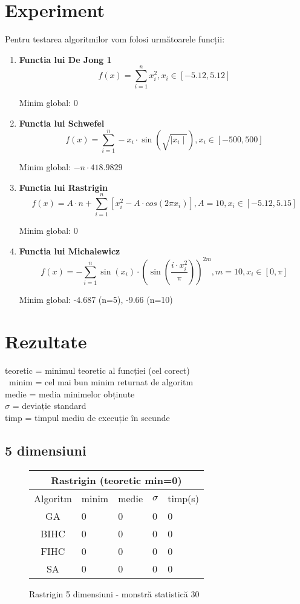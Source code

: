 \documentclass{article}
\begin{document}
\section{Experiment}
Pentru testarea algoritmilor vom folosi următoarele funcții:
\begin{enumerate}
\item \textbf{Functia lui De Jong 1}
$$ f(x) = \sum_{i=1}^n x_i^2, 
x_i \in \left[ -5.12, 5.12 \right]$$

Minim global: 0

\item \textbf{Functia lui Schwefel}
$$ f(x) = \sum_{i=1}^n -x_i \cdot \sin (\sqrt{\mid x_i\mid}),
x_i \in \left[ -500, 500\right]  $$

Minim global: $-n \cdot 418.9829$
\item \textbf{Functia lui Rastrigin}
$$ f(x) = A \cdot n + \sum_{i=1}^n \left[ x_i^2 - A \cdot cos(2 \pi x_i) \right],
A = 10, x_i \in \left[ -5.12, 5.15 \right]$$

Minim global: 0
\item \textbf{Functia lui Michalewicz}
$$ f(x) = -\sum_{i=1}^n \sin (x_i) \cdot \left( \sin \left( \frac{i \cdot x_i^{2}}{\pi} \right) \right)  ^{2m},
m = 10, x_i \in \left[ 0, \pi \right] $$

Minim global: -4.687 (n=5), -9.66 (n=10)
\end{enumerate}


\section{Rezultate}
teoretic = minimul teoretic al funcției (cel corect)\\\
minim = cel mai bun minim returnat de algoritm\\
medie = media minimelor obținute\\
$\sigma$ = deviație standard\\
timp = timpul mediu de execuție în secunde\\


\clearpage
\subsection{5 dimensiuni}

\begin{figure}[!h]
\begin{tabular}{||c|||l|l|l|l||}
  \hline
  \multicolumn{5}{||c||}{Rastrigin (teoretic min=0)} \\ \hline
  Algoritm & minim & medie & $\sigma$ & timp(s) \\ \hline \hline
  GA & 0 & 0 & 0 & 0 \\ \hline
  BIHC & 0 & 0 & 0 & 0\\ \hline
  FIHC & 0 & 0 & 0 & 0 \\ \hline
  SA & 0 & 0 & 0 & 0 \\ \hline
\end{tabular}
\caption{Rastrigin 5 dimensiuni - monstră statistică 30} 
\end{figure}
\end{document}
